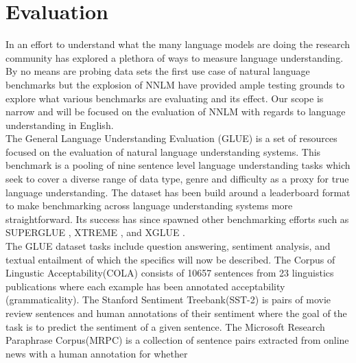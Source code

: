 \section{Evaluation}
In an effort to understand what the many language models are doing the research community has explored a plethora of ways to measure language understanding. By no means are probing data sets the first use case of natural language benchmarks but the explosion of NNLM have provided ample testing grounds to explore what various benchmarks are evaluating and its effect. Our scope is narrow and will be focused on the evaluation of NNLM with regards to language understanding in English. \\
The General Language Understanding Evaluation (GLUE) \cite{Wang2018GLUEAM} is a set of resources focused on the evaluation of natural language understanding systems. This benchmark is a pooling of nine sentence level language understanding tasks which seek to cover a diverse range of data type, genre and difficulty as a proxy for true language understanding. The dataset has been build around a leaderboard format to make benchmarking across language understanding systems more straightforward. Its success has since spawned other benchmarking efforts such as SUPERGLUE \cite{Wang2019SuperGLUEAS}, XTREME \cite{Hu2020XTREMEAM}, and XGLUE \cite{Liang2020XGLUEAN}. \\
The GLUE dataset tasks include question answering, sentiment analysis, and textual entailment of which the specifics will now be described. The Corpus of Lingustic Acceptability(COLA) \cite{Warstadt2019NeuralNA} consists of 10657 sentences from 23 linguistics publications where each example has been annotated acceptability (grammaticality). The Stanford Sentiment Treebank(SST-2) \cite{Socher2013RecursiveDM} is pairs of movie review sentences and human annotations of their sentiment where the goal of the task is to predict the sentiment of a given
sentence. The Microsoft Research Paraphrase Corpus(MRPC) \cite{Dolan2005AutomaticallyCA} is a collection of sentence pairs extracted from online news with a human annotation for whether
